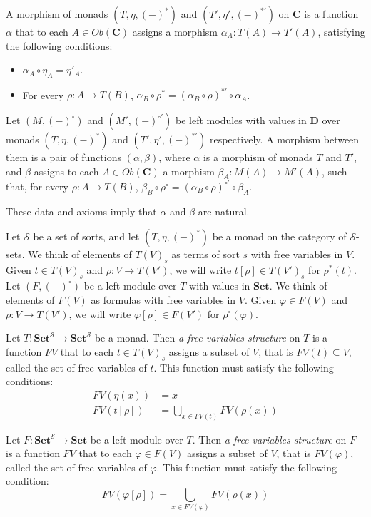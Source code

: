 \documentclass[reqno]{amsart}
\theoremstyle{definition}
\theoremstyle{remark}
\newcommand{\cat}[1]{\mathbf{#1}}
\newcommand{\C}{\cat{C}}
\newcommand{\D}{\cat{D}}
\newcommand{\Set}{\cat{Set}}
\numberwithin{figure}{section}
\begin{document}
\begin{defn}
A morphism of monads $(T,\eta,(-)^*)$ and $(T',\eta',(-)^{*'})$ on $\C$ is a function $\alpha$ that to each $A \in Ob(\C)$ assigns a morphism $\alpha_A : T(A) \to T'(A)$,
satisfying the following conditions:
\begin{itemize}
\item $\alpha_A \circ \eta_A = \eta'_A$.
\item For every $\rho : A \to T(B)$, $\alpha_B \circ \rho^* = (\alpha_B \circ \rho)^{*'} \circ \alpha_A$.
\end{itemize}

Let $(M,(-)^\circ)$ and $(M',(-)^{\circ'})$ be left modules with values in $\D$ over monads $(T,\eta,(-)^*)$ and $(T',\eta',(-)^{*'})$ respectively.
A morphism between them is a pair of functions $(\alpha,\beta)$, where $\alpha$ is a morphism of monads $T$ and $T'$,
and $\beta$ assigns to each $A \in Ob(\C)$ a morphism $\beta_A : M(A) \to M'(A)$,
such that, for every $\rho : A \to T(B)$, $\beta_B \circ \rho^\circ = (\alpha_B \circ \rho)^{\circ'} \circ \beta_A$.
\end{defn}
These data and axioms imply that $\alpha$ and $\beta$ are natural.

Let $\mathcal{S}$ be a set of sorts, and let $(T,\eta,(-)^*)$ be a monad on the category of $\mathcal{S}$-sets.
We think of elements of $T(V)_s$ as terms of sort $s$ with free variables in $V$.
Given $t \in T(V)_s$ and $\rho : V \to T(V')$, we will write $t[\rho] \in T(V')_s$ for $\rho^*(t)$.
Let $(F,(-)^\circ)$ be a left module over $T$ with values in $\Set$.
We think of elements of $F(V)$ as formulas with free variables in $V$.
Given $\varphi \in F(V)$ and $\rho : V \to T(V')$, we will write $\varphi[\rho] \in F(V')$ for $\rho^\circ(\varphi)$.

Let $T : \Set^\mathcal{S} \to \Set^\mathcal{S}$ be a monad.
Then \emph{a free variables structure} on $T$ is a function $FV$ that to each $t \in T(V)_s$ assigns a subset of $V$, that is $FV(t) \subseteq V$, called the set of free variables of $t$.
This function must satisfy the following conditions:
\begin{align*}
FV(\eta(x)) & = x \\
FV(t[\rho]) & = \bigcup_{x \in FV(t)} FV(\rho(x))
\end{align*}

Let $F : \Set^\mathcal{S} \to \Set$ be a left module over $T$.
Then \emph{a free variables structure} on $F$ is a function $FV$ that to each $\varphi \in F(V)$ assigns a subset of $V$, that is $FV(\varphi)$, called the set of free variables of $\varphi$.
This function must satisfy the following condition:
\[ FV(\varphi[\rho]) = \bigcup_{x \in FV(\varphi)} FV(\rho(x)) \]
\end{document}
